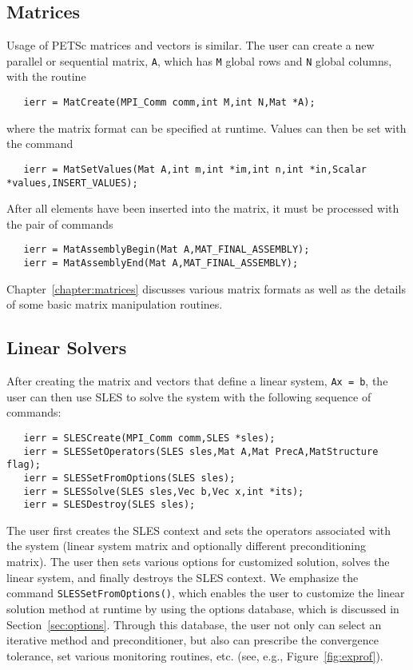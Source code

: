 \subsection*{Matrices}

Usage of PETSc matrices and vectors is similar.  
The user can create a new parallel or sequential matrix, {\tt A}, which
has {\tt M} global rows and {\tt N} global columns, with the routine
\begin{verbatim}
   ierr = MatCreate(MPI_Comm comm,int M,int N,Mat *A);
\end{verbatim}
where the matrix format can be specified at runtime.
Values can then be set with the command
\begin{verbatim}
   ierr = MatSetValues(Mat A,int m,int *im,int n,int *in,Scalar *values,INSERT_VALUES);
\end{verbatim}
After  all elements have been inserted into the
matrix, it must be processed with the pair of commands
 
\begin{verbatim}
   ierr = MatAssemblyBegin(Mat A,MAT_FINAL_ASSEMBLY);
   ierr = MatAssemblyEnd(Mat A,MAT_FINAL_ASSEMBLY);
\end{verbatim}
Chapter~\ref{chapter:matrices} discusses various matrix formats as
well as the details of some basic matrix manipulation routines.

\subsection*{Linear Solvers}

After creating the matrix and vectors that define a linear system,
{\tt Ax = b}, the user can then use SLES to solve the system 
with the following sequence of commands: 
 
  
\begin{verbatim}
   ierr = SLESCreate(MPI_Comm comm,SLES *sles); 
   ierr = SLESSetOperators(SLES sles,Mat A,Mat PrecA,MatStructure flag);
   ierr = SLESSetFromOptions(SLES sles);
   ierr = SLESSolve(SLES sles,Vec b,Vec x,int *its);
   ierr = SLESDestroy(SLES sles);
\end{verbatim}
The user first creates the SLES context and sets the operators
associated with the system (linear system matrix and optionally different
preconditioning matrix).  The user then sets various options for
customized solution, solves the linear system, and finally destroys
the SLES context.  We emphasize the command {\tt SLESSetFromOptions()}, 
which enables the user to customize the linear solution
method at runtime by using the options database, which is discussed in
Section~\ref{sec:options}. Through this database, the user not only
can select an iterative method and preconditioner, but also can prescribe
the convergence tolerance, set various monitoring routines, etc.
(see, e.g., Figure~\ref{fig:exprof}).

